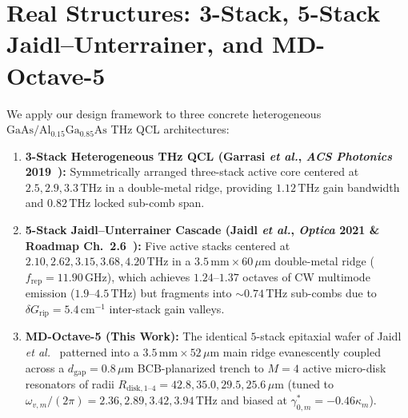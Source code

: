 \documentclass[11pt,letterpaper]{article}
\begin{document}
\section{Real Structures: 3-Stack, 5-Stack Jaidl--Unterrainer, and MD-Octave-5}
\label{sec:real_devices}

We apply our design framework to three concrete heterogeneous $\mathrm{GaAs}/\mathrm{Al}_{0.15}\mathrm{Ga}_{0.85}\mathrm{As}$ THz QCL architectures:
\begin{enumerate}
    \item \textbf{3-Stack Heterogeneous THz QCL (Garrasi \textit{et al.}, \textit{ACS Photonics} 2019~\cite{Garrasi2019}):} Symmetrically arranged three-stack active core centered at $2.5, 2.9, 3.3\,\mathrm{THz}$ in a double-metal ridge, providing $1.12\,\mathrm{THz}$ gain bandwidth and $0.82\,\mathrm{THz}$ locked sub-comb span.
    \item \textbf{5-Stack Jaidl--Unterrainer Cascade (Jaidl \textit{et al.}, \textit{Optica} 2021 \& Roadmap Ch.~2.6~\cite{Jaidl2021,JaidlUnterrainerRoadmap2025}):} Five active stacks centered at $2.10, 2.62, 3.15, 3.68, 4.20\,\mathrm{THz}$ in a $3.5\,\mathrm{mm} \times 60\,\mu\mathrm{m}$ double-metal ridge ($f_{\mathrm{rep}} = 11.90\,\mathrm{GHz}$), which achieves $1.24\text{--}1.37$ octaves of CW multimode emission ($1.9\text{--}4.5\,\mathrm{THz}$) but fragments into $\sim 0.74\,\mathrm{THz}$ sub-combs due to $\delta G_{\mathrm{rip}} = 5.4\,\mathrm{cm}^{-1}$ inter-stack gain valleys.
    \item \textbf{MD-Octave-5 (This Work):} The identical $5$-stack epitaxial wafer of Jaidl \textit{et al.}~\cite{Jaidl2021} patterned into a $3.5\,\mathrm{mm} \times 52\,\mu\mathrm{m}$ main ridge evanescently coupled across a $d_{\mathrm{gap}} = 0.8\,\mu\mathrm{m}$ BCB-planarized trench to $M = 4$ active micro-disk resonators of radii $R_{\mathrm{disk},1\text{--}4} = 42.8, 35.0, 29.5, 25.6\,\mu\mathrm{m}$ (tuned to $\omega_{v,m}/(2\pi) = 2.36, 2.89, 3.42, 3.94\,\mathrm{THz}$ and biased at $\gamma_{0,m}^* = -0.46\kappa_m$).
\end{enumerate}
\end{document}
